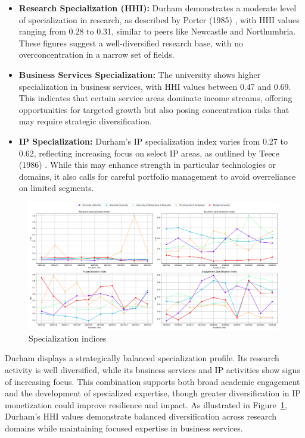 \documentclass[journal,onecolumn, 10pt,draftclsnofoot]{IEEEtran}
\begin{document}
\begin{itemize}
    \item \textbf{Research Specialization (HHI):} Durham demonstrates a moderate level of specialization in research, as described by Porter (1985) \cite{porter1985competitive}, with HHI values ranging from 0.28 to 0.31, similar to peers like Newcastle and Northumbria. These figures suggest a well-diversified research base, with no overconcentration in a narrow set of fields.

\item \textbf{Business Services Specialization:} The university shows higher specialization in business services, with HHI values between 0.47 and 0.69. This indicates that certain service areas dominate income streams, offering opportunities for targeted growth but also posing concentration risks that may require strategic diversification.

\item \textbf{IP Specialization:} Durham's IP specialization index varies from 0.27 to 0.62, reflecting increasing focus on select IP areas, as outlined by Teece (1986) \cite{teece1986profiting}. While this may enhance strength in particular technologies or domains, it also calls for careful portfolio management to avoid overreliance on limited segments.
\end{itemize}



\begin{figure}[h]
\centering
\includegraphics[width=0.99\textwidth]{Fig/figure37.specialization_indices.png}
\caption{Specialization indices}
\label{fig:specialization-indices}
\end{figure}

Durham displays a strategically balanced specialization profile. Its research activity is well diversified, while its business services and IP activities show signs of increasing focus. This combination supports both broad academic engagement and the development of specialized expertise, though greater diversification in IP monetization could improve resilience and impact. As illustrated in Figure~\ref{fig:specialization-indices}, Durham's HHI values demonstrate balanced diversification across research domains while maintaining focused expertise in business services.
\end{document}
